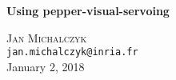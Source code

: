 \begin{titlepage}
\begin{center}

{\huge \bfseries Using pepper-visual-servoing}

\vspace{2cm} 

\textsc{Jan Michalczyk} \\

\texttt{jan.michalczyk@inria.fr} \\[2cm] 

{January 2, 2018}

\vspace{2cm} 

\end{center}
\end{titlepage}
